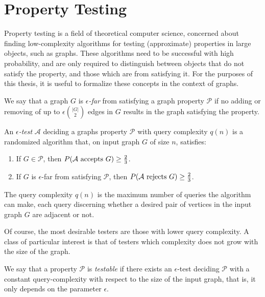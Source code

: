 \section{Property Testing} \label{sec:section_6}

    Property testing is a field of theoretical computer science, concerned about finding low-complexity algorithms
    for testing (approximate) properties in large objects, such as graphs.
    These algorithms need to be successful with high probability, and are only required to distinguish between objects
    that do not satisfy the property, and those which are  from satisfying it.
    For the purposes of this thesis, it is useful to formalize these concepts in the context of graphs.

    \begin{definition}
        We say that a graph $G$ is \emph{$\epsilon$-far} from satisfying a graph property $\mathcal{P}$ if no adding or
        removing of up to $\epsilon {|G| \choose 2}$ edges in $G$ results in the graph satisfying the property.
    \end{definition}

    \begin{definition} \label{def:epsilon_test}
        An \emph{$\epsilon$-test} $\mathcal{A}$ deciding a graphs property $\mathcal{P}$ with query complexity
        $q(n)$ is a randomized algorithm that, on input graph $G$ of size $n$,
        satisfies:
        \begin{enumerate}
            \item If $G \in \mathcal{P}$, then $P( \mathcal{A} \text{ accepts } G ) \geq \frac{2}{3}$.
            \item If $G$ is $\epsilon$-far from satisfying $\mathcal{P}$,
                then $P( \mathcal{A} \text{ rejects } G ) \geq \frac{2}{3}$.
        \end{enumerate}
        The query complexity $q(n)$ is the maximum number of queries the algorithm can make, each query discerning
        whether a desired pair of vertices in the input graph $G$ are adjacent or not.
    \end{definition}

    Of course, the most desirable testers are those with lower query complexity.
    A class of particular interest is that of testers which complexity does not grow with the size of the
    graph.

    \begin{definition}
        We say that a property $\mathcal{P}$ is \emph{testable} if there exists an $\epsilon$-test deciding $\mathcal{P}$
        with a constant query-complexity with respect to the size of the input graph, that is, it only depends on the
        parameter $\epsilon$.
    \end{definition}

